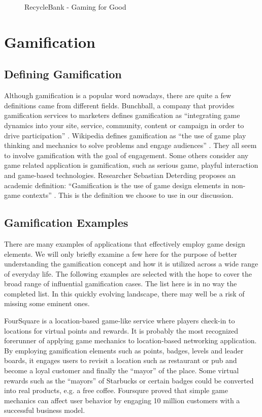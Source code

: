 \begin{figure}[htbp]
	\centering
		\caption{RecycleBank - Gaming for Good}
		\label{fig:recyclebank}
\end{figure}

\section{Gamification}

\subsection{Defining Gamification}
Although gamification is a popular word nowadays, there are quite a few definitions came from different fields. Bunchball, a company that provides gamification services to marketers defines gamification as ``integrating game dynamics into your site, service, community, content or campaign in order to drive participation'' \cite {bunchball}. Wikipedia defines gamification as ``the use of game play thinking and mechanics to solve problems and engage audiences''  \cite {Wikipedia}. They all seem to involve gamification with the goal of engagement. Some others consider any game related application is gamification, such as serious game, playful interaction and game-based technologies. Researcher Sebastian Deterding proposes an academic definition: ``Gamification is the use of game design elements in non-game contexts'' \cite {Deterding2011mt}. This is the definition we choose to use in our discussion.

\subsection{Gamification Examples}
There are many examples of applications that effectively employ game design elements. We will only briefly examine a few here for the purpose of better understanding the gamification concept and how it is utilized across a wide range of everyday life. The following examples are selected with the hope to cover the broad range of influential gamification cases. The list here is in no way the completed list. In this quickly evolving landscape, there may well be a risk of missing some eminent ones.

FourSquare \cite{foursquare} is a location-based game-like service where players check-in to locations for virtual points and rewards. It is probably the most recognized forerunner of applying game mechanics to location-based networking application. By employing gamification elements such as points, badges, levels and leader boards, it engages users to revisit a location such as restaurant or pub and become a loyal customer and finally the ``mayor'' of the place. Some virtual rewards such as the ``mayors'' of Starbucks or certain badges could be converted into real products, e.g. a free coffee. Foursqure proved that simple game mechanics can affect user behavior by engaging 10 million customers with a successful business model.

